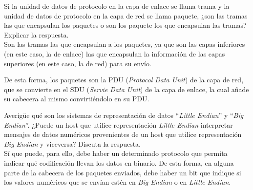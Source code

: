 \begin{ejercicio}
   Si la unidad de datos de protocolo en la capa de enlace se llama trama y la unidad de datos de protocolo en la capa de red se llama paquete, ¿son las tramas las que encapsulan los paquetes o son los paquete los que encapsulan las tramas? Explicar la respuesta. \\
   
   Son las tramas las que encapsulan a los paquetes, ya que son las capas inferiores (en este caso, la de enlace) las que encapsulan la información de las capas superiores (en este caso, la de red) para su envío.

   De esta forma, los paquetes son la PDU (\emph{Protocol Data Unit})  de la capa de red, que se convierte en el SDU (\emph{Servie Data Unit}) de la capa de enlace, la cual añade su cabecera al mismo convirtiéndolo en su PDU\@.
\end{ejercicio}

\begin{ejercicio}
    Averigüe qué son los sistemas de representación de datos ``\textit{Little Endian}'' y ``\textit{Big Endian}''. ¿Puede un host que utilice representación \textit{Little Endian} interpretar mensajes de datos numéricos provenientes de un host que utilice representación \textit{Big Endian} y viceversa? Discuta la respuesta.\\

    Sí que puede, para ello, debe haber un determinado protocolo que permita indicar qué codificación llevan los datos en binario. De esta forma, en alguna parte de la cabecera de los paquetes enviados, debe haber un bit que indique si los valores numéricos que se envían estén en \textit{Big Endian} o en \textit{Little Endian}.
\end{ejercicio}

